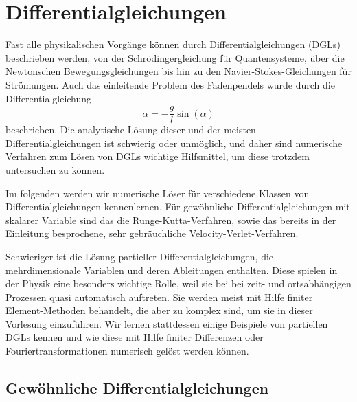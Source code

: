 % 

\chapter{Differentialgleichungen}

Fast alle physikalischen Vorgänge können durch Differentialgleichungen
(DGLs) beschrieben werden, von der Schrödingergleichung für
Quantensysteme, über die Newtonschen Bewegungsgleichungen bis hin zu
den Navier-Stokes-Gleichungen für Strömungen. Auch das einleitende
Problem des Fadenpendels wurde durch die Differentialgleichung
\begin{equation}
  \ddot\alpha = -\frac{g}{l}\sin(\alpha)
\end{equation}
beschrieben. Die analytische Lösung dieser und der meisten
Differentialgleichungen ist schwierig oder unmöglich, und daher sind
numerische Verfahren zum Lösen von DGLs wichtige Hilfsmittel, um diese
trotzdem untersuchen zu können.

Im folgenden werden wir numerische Löser für verschiedene Klassen von
Differentialgleichungen kennenlernen. Für gewöhnliche
Differentialgleichungen mit skalarer Variable sind das die
Runge-Kutta-Verfahren, sowie das bereits in der Einleitung
besprochene, sehr gebräuchliche Velocity-Verlet-Verfahren.

Schwieriger ist die Lösung partieller Differentialgleichungen, die
mehrdimensionale Variablen und deren Ableitungen enthalten.  Diese
spielen in der Physik eine besonders wichtige Rolle, weil sie bei bei
zeit- und ortsabhängigen Prozessen quasi automatisch auftreten. Sie
werden meist mit Hilfe finiter Element-Methoden behandelt, die aber zu
komplex sind, um sie in dieser Vorlesung einzuführen. Wir lernen
stattdessen einige Beispiele von partiellen DGLs kennen und wie diese
mit Hilfe finiter Differenzen oder Fouriertransformationen numerisch
gelöst werden können.

\section{Gewöhnliche Differentialgleichungen}

